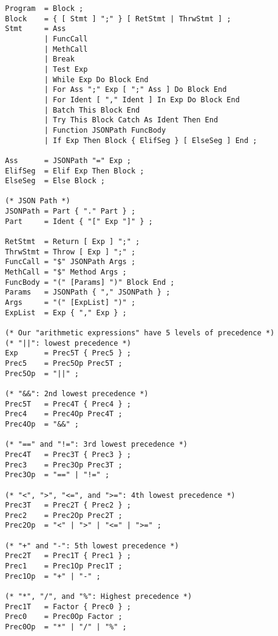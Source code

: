 \begin{center}
    \begin{verbatim}
        Program  = Block ;
        Block    = { [ Stmt ] ";" } [ RetStmt | ThrwStmt ] ;
        Stmt     = Ass
                 | FuncCall
                 | MethCall
                 | Break
                 | Test Exp
                 | While Exp Do Block End
                 | For Ass ";" Exp [ ";" Ass ] Do Block End
                 | For Ident [ "," Ident ] In Exp Do Block End
                 | Batch This Block End
                 | Try This Block Catch As Ident Then End
                 | Function JSONPath FuncBody
                 | If Exp Then Block { ElifSeg } [ ElseSeg ] End ;

        Ass      = JSONPath "=" Exp ;
        ElifSeg  = Elif Exp Then Block ;
        ElseSeg  = Else Block ;

        (* JSON Path *)
        JSONPath = Part { "." Part } ;
        Part     = Ident { "[" Exp "]" } ;

        RetStmt  = Return [ Exp ] ";" ;
        ThrwStmt = Throw [ Exp ] ";" ;
        FuncCall = "$" JSONPath Args ;
        MethCall = "$" Method Args ;
        FuncBody = "(" [Params] ")" Block End ;
        Params   = JSONPath { "," JSONPath } ;
        Args     = "(" [ExpList] ")" ;
        ExpList  = Exp { "," Exp } ;

        (* Our "arithmetic expressions" have 5 levels of precedence *)
        (* "||": lowest precedence *)
        Exp      = Prec5T { Prec5 } ;
        Prec5    = Prec5Op Prec5T ;
        Prec5Op  = "||" ;

        (* "&&": 2nd lowest precedence *)
        Prec5T   = Prec4T { Prec4 } ;
        Prec4    = Prec4Op Prec4T ;
        Prec4Op  = "&&" ;

        (* "==" and "!=": 3rd lowest precedence *)
        Prec4T   = Prec3T { Prec3 } ;
        Prec3    = Prec3Op Prec3T ;
        Prec3Op  = "==" | "!=" ;

        (* "<", ">", "<=", and ">=": 4th lowest precedence *)
        Prec3T   = Prec2T { Prec2 } ;
        Prec2    = Prec2Op Prec2T ;
        Prec2Op  = "<" | ">" | "<=" | ">=" ;

        (* "+" and "-": 5th lowest precedence *)
        Prec2T   = Prec1T { Prec1 } ;
        Prec1    = Prec1Op Prec1T ;
        Prec1Op  = "+" | "-" ;

        (* "*", "/", and "%": Highest precedence *)
        Prec1T   = Factor { Prec0 } ;
        Prec0    = Prec0Op Factor ;
        Prec0Op  = "*" | "/" | "%" ;


\end{verbatim}
\end{center}
